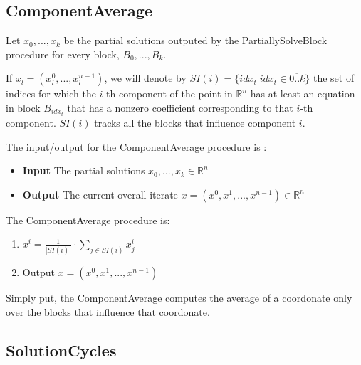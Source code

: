 \documentclass[a4paper,twoside,10pt]{report}
\begin{document}
	\clearpage
		
	\subsection{ComponentAverage}
	
		Let \(x_0, ..., x_k\) be the partial solutions outputed by the PartiallySolveBlock procedure for every block, \(B_0, ..., B_k\). 

		If \(x_l = (x^0_l, ..., x^{n-1}_l)\), we will denote by \(SI(i) = \{idx_t| idx_t \in\overline{0..k}\}\) the set of indices for which the \(i\)-th component of the 
point in \(\mathbb{R} ^n\) has at least an equation in block \(B_{idx_t}\) that has a nonzero coefficient corresponding to that \(i\)-th component. \(SI(i)\) tracks all the 
blocks that influence component \(i\).

	The input/output for the ComponentAverage procedure is :
	
	\begin{itemize}
		\item \textbf{Input} The partial solutions \(x_0, ..., x_k \in \mathbb{R} ^n\)
		\item \textbf{Output} The current overall iterate \(x = (x^0, x^1,..., x^{n-1})\in \mathbb{R} ^n\)
	\end{itemize}
	
	The ComponentAverage procedure is:
	
	\begin{enumerate}
		\item \(x^i = \frac{1}{|SI(i)|} \cdot \sum_{j\in SI(i)} {x^i_j}\)
		\item Output \(x = (x^0, x^1, ..., x^{n-1})\)
	\end{enumerate}		
	
	
	Simply put, the ComponentAverage computes the average of a coordonate only over the blocks that influence that coordonate.
		
	\subsection{SolutionCycles}
	


\end{document}
